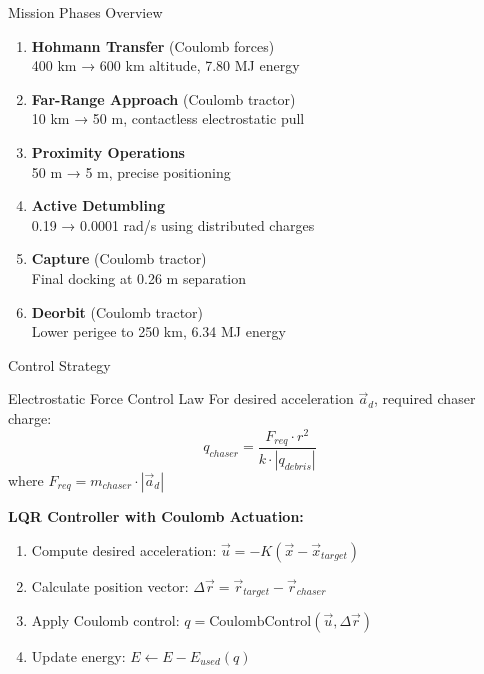 \documentclass[aspectratio=169]{beamer}
\begin{document}
\begin{frame}{Mission Phases Overview}
\begin{enumerate}
    \item \textbf{Hohmann Transfer} (Coulomb forces)\\
          400 km → 600 km altitude, 7.80 MJ energy

    \item \textbf{Far-Range Approach} (Coulomb tractor)\\
          10 km → 50 m, contactless electrostatic pull

    \item \textbf{Proximity Operations}\\
          50 m → 5 m, precise positioning

    \item \textbf{Active Detumbling}\\
          0.19 → 0.0001 rad/s using distributed charges

    \item \textbf{Capture} (Coulomb tractor)\\
          Final docking at 0.26 m separation

    \item \textbf{Deorbit} (Coulomb tractor)\\
          Lower perigee to 250 km, 6.34 MJ energy
\end{enumerate}
\end{frame}

\begin{frame}{Control Strategy}
\begin{block}{Electrostatic Force Control Law}
For desired acceleration $\vec{a}_d$, required chaser charge:
\begin{equation}
q_{chaser} = \frac{F_{req} \cdot r^2}{k \cdot |q_{debris}|}
\end{equation}
where $F_{req} = m_{chaser} \cdot |\vec{a}_d|$
\end{block}

\textbf{LQR Controller with Coulomb Actuation:}
\begin{enumerate}
    \item Compute desired acceleration: $\vec{u} = -K(\vec{x} - \vec{x}_{target})$
    \item Calculate position vector: $\Delta \vec{r} = \vec{r}_{target} - \vec{r}_{chaser}$
    \item Apply Coulomb control: $q = \text{CoulombControl}(\vec{u}, \Delta \vec{r})$
    \item Update energy: $E \leftarrow E - E_{used}(q)$
\end{enumerate}
\end{frame}
\end{document}
